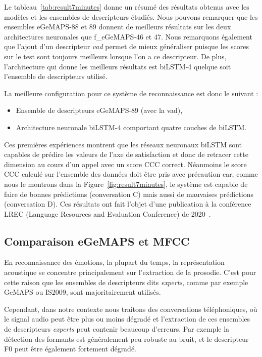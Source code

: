 

Le tableau~\ref{tab:result7minutes} donne un résumé des résultats obtenus avec les modèles et les ensembles de descripteurs étudiés.
Nous pouvons remarquer que les ensembles eGeMAPS-88 et 89 donnent de meilleurs résultats sur les deux architectures neuronales que f\_eGeMAPS-46 et 47. Nous remarquons également que l'ajout d'un descripteur \textit{vad} permet de mieux généraliser puisque les scores sur le test sont toujours meilleurs lorsque l'on a ce descripteur. De plus, l'architecture qui donne les meilleurs résultats est biLSTM-4 quelque soit l'ensemble de descripteurs utilisé.

La meilleure configuration pour ce système de reconnaissance est donc le suivant :

\begin{itemize}
  \item Ensemble de descripteurs eGeMAPS-89 (avec la vad),
  \item Architecture neuronale biLSTM-4 comportant quatre couches de biLSTM.
\end{itemize}

Ces premières expériences montrent que les réseaux neuronaux biLSTM sont capables de prédire les valeurs de l'axe de satisfaction et donc de retracer cette dimension au cours d’un appel avec un score CCC correct. Néanmoins le score CCC calculé sur l'ensemble des données doit être pris avec précaution car, comme nous le montrons dans la Figure~\ref{fig:result7minutes}, le système est capable de faire de bonnes prédictions (conversation C) mais aussi de mauvaises prédictions (conversation D). Ces résultats ont fait l'objet d'une publication à la conférence LREC (Language Resources and Evaluation Conference) de 2020~\cite{Macary2020allosat}.



\subsection{Comparaison eGeMAPS et MFCC}
En reconnaissance des émotions, la plupart du temps, la représentation acoustique se concentre principalement sur l'extraction de la prosodie. C'est pour cette raison que les ensembles de descripteurs dits \textit{experts}, comme par exemple GeMAPS ou IS2009, sont majoritairement utilisés.

Cependant, dans notre contexte nous traitons des conversations téléphoniques, où le signal audio peut être plus ou moins dégradé et l'extraction de ces ensembles de descripteurs \textit{experts} peut contenir beaucoup d'erreurs. Par exemple la détection des formants est généralement peu robuste au bruit, et le descripteur F0 peut être également fortement dégradé.%


